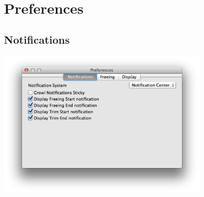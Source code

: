 \documentclass[]{article}
\begin{document}
\clearpage
\section{Preferences}

\subsection{Notifications}
\label{notifications}
\includegraphics[width=400px]{notifications_tab}
\end{document}
